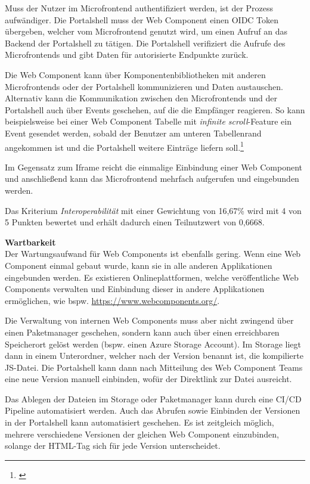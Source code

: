 Muss der Nutzer im Microfrontend authentifiziert werden, ist der Prozess aufwändiger. Die Portalshell muss der Web Component einen \gls{OIDC} Token übergeben, welcher vom Microfrontend genutzt wird, um einen Aufruf an das Backend der Portalshell zu tätigen. Die Portalshell verifiziert die Aufrufe des Microfrontends und gibt Daten für autorisierte Endpunkte zurück.

Die Web Component kann über Komponentenbibliotheken mit anderen Microfrontends oder der Portalshell kommunizieren und Daten austauschen. Alternativ kann die Kommunikation zwischen den Microfrontends und der Portalshell auch über Events geschehen, auf die die Empfänger reagieren. So kann beispielsweise bei einer Web Component Tabelle mit \textit{infinite scroll}-Feature ein Event gesendet werden, sobald der Benutzer am unteren Tabellenrand angekommen ist und die Portalshell weitere Einträge liefern soll.\footnote{\cite[vgl.][]{Rauber2020d}}

Im Gegensatz zum Iframe reicht die einmalige Einbindung einer Web Component und anschließend kann das Microfrontend mehrfach aufgerufen und eingebunden werden.

Das Kriterium \textit{Interoperabilität} mit einer Gewichtung von 16,67\% wird mit 4 von 5 Punkten bewertet und erhält dadurch einen Teilnutzwert von 0,6668.

\textbf{Wartbarkeit}\\
Der Wartungsaufwand für Web Components ist ebenfalls gering. Wenn eine Web Component einmal gebaut wurde, kann sie in alle anderen Applikationen eingebunden werden. Es existieren Onlineplattformen, welche veröffentliche Web Components verwalten und Einbindung dieser in andere Applikationen ermöglichen, wie bspw. \url{https://www.webcomponents.org/}.

Die Verwaltung von internen Web Components muss aber nicht zwingend über einen Paketmanager geschehen, sondern kann auch über einen erreichbaren Speicherort gelöst werden (bspw. einen Azure Storage Account). Im Storage liegt dann in einem Unterordner, welcher nach der Version benannt ist, die kompilierte \gls{JS}-Datei. Die Portalshell kann dann nach Mitteilung des Web Component Teams eine neue Version manuell einbinden, wofür der Direktlink zur Datei ausreicht.

Das Ablegen der Dateien im Storage oder Paketmanager kann durch eine \gls{CI/CD} Pipeline automatisiert werden. Auch das Abrufen sowie Einbinden der Versionen in der Portalshell kann automatisiert geschehen. Es ist zeitgleich möglich, mehrere verschiedene Versionen der gleichen Web Component einzubinden, solange der \gls{HTML}-Tag sich für jede Version unterscheidet.

